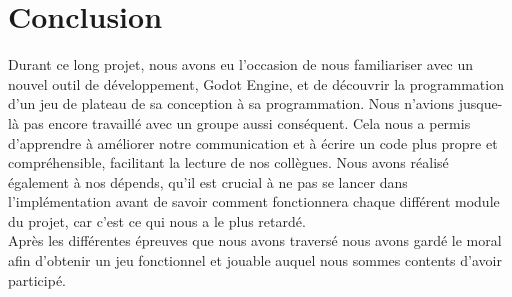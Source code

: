 \documentclass[a4paper,11pt]{article}
\begin{document}
\section{Conclusion}

    Durant ce long projet, nous avons eu l’occasion de nous familiariser avec un nouvel outil de développement, Godot Engine, et de découvrir la programmation d’un jeu de plateau de sa conception à sa programmation. Nous n’avions jusque-là pas encore travaillé avec un groupe aussi conséquent. Cela nous a permis d’apprendre à améliorer notre communication et à écrire un code plus propre et compréhensible, facilitant la lecture de nos collègues. Nous avons réalisé également à nos dépends, qu’il est crucial  à ne pas se lancer dans l’implémentation avant de savoir comment fonctionnera chaque différent module du projet, car c’est ce qui nous a le plus retardé. \\

	Après les différentes épreuves que nous avons traversé nous avons gardé le moral afin d’obtenir un jeu fonctionnel et jouable auquel nous sommes contents d’avoir participé.
\end{document}
